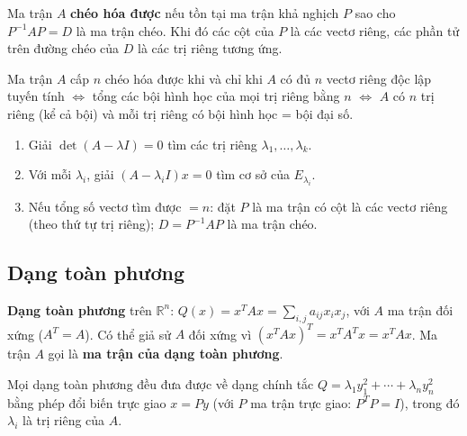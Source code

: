 \documentclass[12pt,a4paper]{article}
\begin{document}
\begin{dinhnghia}
  Ma trận $A$ \textbf{chéo hóa được} nếu tồn tại ma trận khả nghịch $P$ sao cho $P^{-1}AP = D$ là ma trận chéo. Khi đó các cột của $P$ là các vectơ riêng, các phần tử trên đường chéo của $D$ là các trị riêng tương ứng.
\end{dinhnghia}

\begin{dinhly}[title={Điều kiện chéo hóa được}]
  Ma trận $A$ cấp $n$ chéo hóa được khi và chỉ khi $A$ có đủ $n$ vectơ riêng độc lập tuyến tính $\Leftrightarrow$ tổng các bội hình học của mọi trị riêng bằng $n$ $\Leftrightarrow$ $A$ có $n$ trị riêng (kể cả bội) và mỗi trị riêng có bội hình học = bội đại số.
\end{dinhly}

\begin{phuongphap}[title={Cách chéo hóa}]
  \begin{enumerate}
    \item Giải $\det(A - \lambda I) = 0$ tìm các trị riêng $\lambda_1, \ldots, \lambda_k$.
    \item Với mỗi $\lambda_i$, giải $(A - \lambda_i I)x = 0$ tìm cơ sở của $E_{\lambda_i}$.
    \item Nếu tổng số vectơ tìm được $= n$: đặt $P$ là ma trận có cột là các vectơ riêng (theo thứ tự trị riêng); $D = P^{-1}AP$ là ma trận chéo.
  \end{enumerate}
\end{phuongphap}

\subsection{Dạng toàn phương}

\begin{dinhnghia}
  \textbf{Dạng toàn phương} trên $\mathbb{R}^n$: $Q(x) = x^T A x = \sum_{i,j} a_{ij} x_i x_j$, với $A$ ma trận đối xứng ($A^T = A$). Có thể giả sử $A$ đối xứng vì $(x^T A x)^T = x^T A^T x = x^T A x$. Ma trận $A$ gọi là \textbf{ma trận của dạng toàn phương}.
\end{dinhnghia}

\begin{dinhly}[title={Dạng chính tắc}]
  Mọi dạng toàn phương đều đưa được về dạng chính tắc $Q = \lambda_1 y_1^2 + \cdots + \lambda_n y_n^2$ bằng phép đổi biến trực giao $x = Py$ (với $P$ ma trận trực giao: $P^T P = I$), trong đó $\lambda_i$ là trị riêng của $A$.
\end{dinhly}
\end{document}
